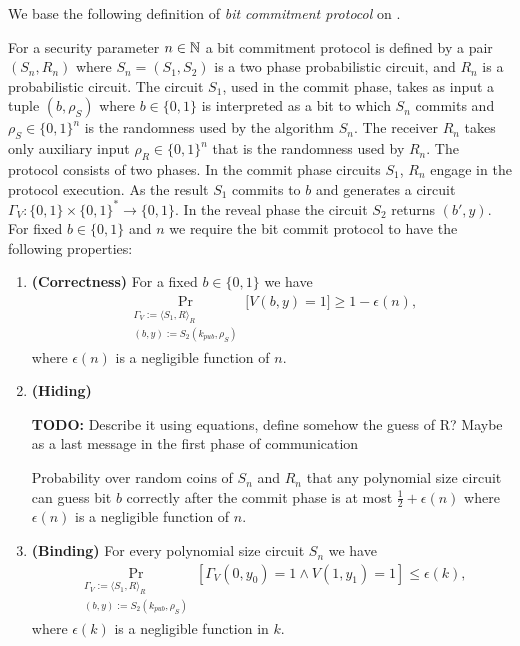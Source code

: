 \documentclass[11pt,a4paper,titlepage]{memoir}
\begin{document}
We base the following definition of \textit{bit commitment protocol} on \cite{LectureNotesComThCrypto}.
\begin{definition}
  \label{def:bit_commitment}
For a security parameter $n \in \mathbb{N}$ a \textnormal{bit commitment protocol} is defined by a pair $(S_n, R_n)$
where $S_n = (S_1, S_2)$ is a two phase probabilistic circuit, and $R_n$ is a probabilistic circuit.
The circuit $S_1$, used in the commit phase, takes as input a tuple $(b, \rho_S)$ where $b \in \{0,1\}$ is interpreted as a bit to which $S_n$
commits and $\rho_S \in \{0,1\}^{n}$ is the randomness used by the algorithm $S_n$.
The receiver $R_n$ takes only auxiliary input $\rho_R \in \{0,1\}^{n}$ that is the randomness used by $R_n$.
The protocol consists of two phases. In the commit phase circuits $S_1$, $R_n$ engage in the protocol execution.
As the result $S_1$ commits to $b$ and generates a circuit $\Gamma_V: \{0,1\} \times \{0,1\}^{*} \rightarrow \{0,1\}$.
In the reveal phase the circuit $S_2$ returns $(b', y)$. For fixed $b \in \{0,1\}$ and $n$ we require the bit commit protocol to have the following properties:
\begin{enumerate}[]
\item{\textnormal{\textbf{(Correctness)}}} For a fixed $b \in \{0,1\}$ we have
  \begin{align*}
    \underset{\substack{\Gamma_V := \langle S_1, R \rangle_{R} \\ (b,y) := S_2(k_{pub}, \rho_S) }}{\Pr}\Big[V(b,y) = 1 \Big] \geq 1 - \epsilon(n),
  \end{align*}
where $\epsilon(n)$ is a negligible function of $n$.
\item{\textnormal{\textbf{(Hiding)}}}
  \begin{todo}
    \textbf{TODO:} Describe it using equations, define somehow the guess of R? Maybe as a last message in the first phase of communication
  \end{todo}
  Probability over random coins of $S_n$ and $R_n$ that any polynomial size circuit
  can guess bit $b$ correctly after the commit phase is at most $\frac{1}{2} + \epsilon(n)$ where $\epsilon(n)$ is a negligible function of $n$.
\item{\textnormal{\textbf{(Binding)}}}
  For every polynomial size circuit $S_n$ we have
  \begin{align*}
    \underset{\substack{\Gamma_V := \langle S_1, R \rangle_{R} \\ (b,y) := S_2(k_{pub}, \rho_S)}}{\Pr}[\Gamma_V(0,y_0) = 1 \land V(1,y_1) = 1] \leq \epsilon(k),
  \end{align*}
  where $\epsilon(k)$ is a negligible function in $k$.
\end{enumerate}
\end{definition}
\end{document}
